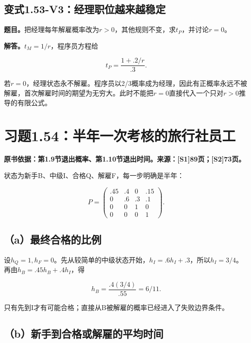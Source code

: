 \documentclass[
  11pt,
  a4paper,
  UTF8,
  fontset=fandol]{ctexart}
\begin{document}
\subsection{变式1.53-V3：经理职位越来越稳定}\label{ux53d8ux5f0f1.53-v3ux7ecfux7406ux804cux4f4dux8d8aux6765ux8d8aux7a33ux5b9a}

\textbf{题目。}把经理每年解雇概率改为\(r>0\)，其他规则不变，求\(t_P\)，并讨论\(r=0\)。

\textbf{解答。}\(t_M=1/r\)，程序员方程给

\[
\boxed{t_P=\frac{1+.2/r}{.3}.}
\]

若\(r=0\)，经理状态永不解雇。程序员以2/3概率成为经理，因此有正概率永远不被解雇，首次解雇时间的期望为无穷大。此时不能把\(r=0\)直接代入一个只对\(r>0\)推导的有限公式。

\section{习题1.54：半年一次考核的旅行社员工}\label{ux4e60ux98981.54ux534aux5e74ux4e00ux6b21ux8003ux6838ux7684ux65c5ux884cux793eux5458ux5de5}

\textbf{原书依据：第1.9节退出概率、第1.10节退出时间。来源：{[}S1{]}89页；{[}S2{]}73页。}

状态为新手B、中级I、合格Q、解雇F，每一步明确是半年：

\[
P=\begin{pmatrix}
.45&.4&0&.15\\0&.6&.3&.1\\0&0&1&0\\0&0&0&1
\end{pmatrix}.
\]

\subsection{（a）最终合格的比例}\label{aux6700ux7ec8ux5408ux683cux7684ux6bd4ux4f8b}

设\(h_Q=1,h_F=0\)。先从较简单的中级状态开始，\(h_I=.6h_I+.3\)，所以\(h_I=3/4\)。再由\(h_B=.45h_B+.4h_I\)，得

\[
\boxed{h_B=\frac{.4(3/4)}{.55}=6/11.}
\]

只有先到I才有可能合格；直接从B被解雇的概率已经进入了失败边界条件。

\subsection{（b）新手到合格或解雇的平均时间}\label{bux65b0ux624bux5230ux5408ux683cux6216ux89e3ux96c7ux7684ux5e73ux5747ux65f6ux95f4}
\end{document}
